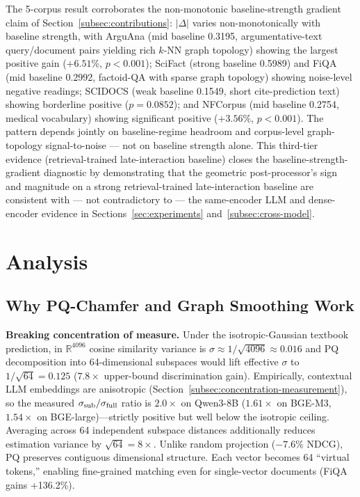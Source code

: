 \documentclass[review,1p]{elsarticle}
\newcommand{\R}{\mathbb{R}}
\begin{document}
The 5-corpus result corroborates the non-monotonic baseline-strength gradient claim of Section~\ref{subsec:contributions}: $|\Delta|$ varies non-monotonically with baseline strength, with ArguAna (mid baseline 0.3195, argumentative-text query/document pairs yielding rich $k$-NN graph topology) showing the largest positive gain ($+6.51\%$, $p<0.001$); SciFact (strong baseline 0.5989) and FiQA (mid baseline 0.2992, factoid-QA with sparse graph topology) showing noise-level negative readings; SCIDOCS (weak baseline 0.1549, short cite-prediction text) showing borderline positive ($p=0.0852$); and NFCorpus (mid baseline 0.2754, medical vocabulary) showing significant positive ($+3.56\%$, $p<0.001$). The pattern depends jointly on baseline-regime headroom and corpus-level graph-topology signal-to-noise --- not on baseline strength alone. This third-tier evidence (retrieval-trained late-interaction baseline) closes the baseline-strength-gradient diagnostic by demonstrating that the geometric post-processor's sign and magnitude on a strong retrieval-trained late-interaction baseline are consistent with --- not contradictory to --- the same-encoder LLM and dense-encoder evidence in Sections~\ref{sec:experiments} and~\ref{subsec:cross-model}.

\section{Analysis}
\label{sec:analysis}

\subsection{Why PQ-Chamfer and Graph Smoothing Work}
\label{subsec:why-methods}

\textbf{Breaking concentration of measure.} Under the isotropic-Gaussian textbook prediction, in $\R^{4096}$ cosine similarity variance is $\sigma \approx 1/\sqrt{4096} \approx 0.016$ and PQ decomposition into 64-dimensional subspaces would lift effective $\sigma$ to $1/\sqrt{64} = 0.125$ ($7.8\times$ upper-bound discrimination gain). Empirically, contextual LLM embeddings are anisotropic (Section~\ref{subsec:concentration-measurement}), so the measured $\sigma_{\rm sub}/\sigma_{\rm full}$ ratio is $2.0\times$ on Qwen3-8B ($1.61\times$ on BGE-M3, $1.54\times$ on BGE-large)---strictly positive but well below the isotropic ceiling. Averaging across 64 independent subspace distances additionally reduces estimation variance by $\sqrt{64} = 8\times$. Unlike random projection ($-7.6\%$ NDCG), PQ preserves contiguous dimensional structure. Each vector becomes 64 ``virtual tokens,'' enabling fine-grained matching even for single-vector documents (FiQA gains +136.2\%).
\end{document}
